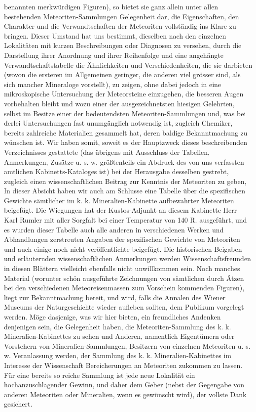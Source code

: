 \documentclass[a4paper, 11pt, oneside, polutonikogreek, german]{article}
\begin{document}
benannten merkwürdigen Figuren), so bietet sie ganz allein unter allen bestehenden Meteoriten-Sammlungen Gelegenheit dar, die Eigenschaften, den Charakter und die Verwandtschaften der Meteoriten vollständig ins Klare zu bringen. Dieser Umstand hat uns bestimmt, dieselben nach den einzelnen Lokalitäten mit kurzen Beschreibungen oder Diagnosen zu versehen, durch die Darstellung ihrer Anordnung und ihrer Reihenfolge und eine angehängte Verwandtschaftstabelle die Ähnlichkeiten und Verschiedenheiten, die sie darbieten (wovon die ersteren im Allgemeinen geringer, die anderen viel grösser sind, als sich mancher Mineraloge vorstellt), zu zeigen, ohne dabei jedoch in eine mikroskopische Untersuchung der Meteorsteine einzugehen, die besseren Augen vorbehalten bleibt und wozu einer der ausgezeichnetsten hiesigen Gelehrten, selbst im Besitze einer der bedeutendsten Meteoriten-Sammlungen und, was bei derlei Untersuchungen fast unumgänglich notwendig ist, zugleich Chemiker, bereits zahlreiche Materialien gesammelt hat, deren baldige Bekanntmachung zu wünschen ist. Wir haben somit, soweit es der Hauptzweck dieses beschreibenden Verzeichnisses gestattete (das übrigens mit Ausschluss der Tabellen, Anmerkungen, Zusätze u. s. w. größtenteils ein Abdruck des von uns verfassten amtlichen Kabinetts-Kataloges ist) bei der Herausgabe desselben gestrebt, zugleich einen wissenschaftlichen Beitrag zur Kenntnis der Meteoriten zu geben, In dieser Absicht haben wir auch am Schlusse eine Tabelle über die spezifischen Gewichte sämtlicher im k. k. Mineralien-Kabinette aufbewahrter Meteoriten beigefügt. Die Wiegungen hat der Kustos-Adjunkt an diesem Kabinette Herr Karl Rumler mit aller Sorgfalt bei einer Temperatur von 140 R. ausgeführt, und es wurden dieser Tabelle auch alle anderen in verschiedenen Werken und Abhandlungen zerstreuten Angaben der spezifischen Gewichte von Meteoriten und auch einige noch nicht veröffentlichte beigefügt. Die historischen Beigaben und erläuternden wissenschaftlichen Anmerkungen werden Wissenschaftsfreunden in diesen Blättern vielleicht ebenfalls nicht unwillkommen sein. Noch manches Material (worunter schön ausgeführte Zeichnungen von sämtlichen durch Ätzen bei den verschiedenen Meteoreisenmassen zum Vorschein kommenden Figuren), liegt zur Bekanntmachung bereit, und wird, falls die Annalen des Wiener Museums der Naturgeschichte wieder aufleben sollten, dem Publikum vorgelegt werden. Möge dasjenige, was wir hier bieten, ein freundliches Andenken denjenigen sein, die Gelegenheit haben, die Meteoriten-Sammlung des k. k. Mineralien-Kabinettes zu sehen und Anderen, namentlich Eigentümern oder Vorstehern von Mineralien-Sammlungen, Besitzern von einzelnen Meteoriten u. s. w. Veranlassung werden, der Sammlung des k. k. Mineralien-Kabinettes im Interesse der Wissenschaft Bereicherungen an Meteoriten zukommen zu lassen. Für eine bereits so reiche Sammlung ist jede neue Lokalität ein hochanzuschlagender Gewinn, und daher dem Geber (nebst der Gegengabe von anderen Meteoriten oder Mineralien, wenn es gewünscht wird), der vollste Dank gesichert.
\end{document}
